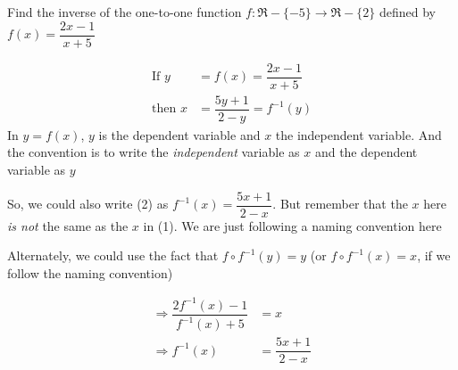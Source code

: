 

\question[2] Find the inverse of the one-to-one function
$f:\Re-\{-5\}\rightarrow \Re-\{2\}$ defined by $f(x)=\dfrac{2x-1}{x+5}$


\ifprintanswers
\fi 

\begin{solution}[\mcq]
	\begin{align}
		\text{If } y &= f(x) = \dfrac{2x-1}{x+5} \\
		\text{then } x &= \dfrac{5y+1}{2-y} = f^{-1}(y)
	\end{align}
	In $y = f(x)$, $y$ is the dependent variable and $x$ the independent variable. 
	And the convention is to write the \textit{independent} variable as $x$ and the 
	dependent variable as $y$
	
	So, we could also write (2) as $f^{-1}(x) = \dfrac{5x+1}{2-x}$. But remember that 
	the $x$ here \textit{is not} the same as the $x$ in (1). We are just following a naming
	convention here
	
	Alternately, we could use the fact that $f \circ f^{-1}(y) = y$ (or $f \circ f^{-1}(x) = x$, if 
	we follow the naming convention)
	
	\begin{align}
		\Rightarrow \dfrac{2f^{-1}(x)-1}{f^{-1}(x)+5} &= x \\
		\Rightarrow f^{-1}(x) &= \dfrac{5x+1}{2-x}
	\end{align}
\end{solution}
